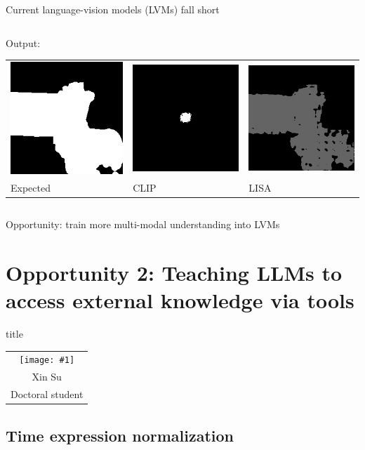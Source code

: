 \documentclass[14pt,aspectratio=169]{beamer}
\newcommand{\headshot}[3]{{\tiny\setlength{\tabcolsep}{0pt}%
\begin{tabular}{c}
\texttt{[image: \#1]} \\
#2 \\
#3
\end{tabular}}}
\newcommand{\sectionbox}{%
\centering
\begin{beamercolorbox}[sep=8pt,center,shadow=true,rounded=true]{title}
  \usebeamerfont{title}\insertsectionhead\par%
\end{beamercolorbox}
\vspace{.2\textheight}}
\begin{document}
\begin{frame}{Current language-vision models (LVMs) fall short}
\begin{columns}
\begin{column}{0.48\textwidth}
\medskip
Output: \\
\begin{tabular}{ l l l @{}}
\includegraphics[width=.25\textwidth]{compgeo/GL024_425_color_output_reference.png}
&
\includegraphics[width=.25\textwidth]{compgeo/GL024_425_color_output_clip.png}
&
\includegraphics[width=.25\textwidth]{compgeo/GL024_425_color_output_lisa.jpg}
\\
Expected & CLIP & LISA
\end{tabular}
\end{column}
\end{columns}
\pause
\bigskip
\alert{Opportunity: train more multi-modal understanding into LVMs}
\end{frame}

\section{Opportunity 2: Teaching LLMs to access external knowledge via tools}

\begin{frame}[b]
\sectionbox
\hfill
\headshot{people/su-xin.jpg}{Xin Su}{Doctoral student}
\end{frame}

\subsection{Time expression normalization}
\end{document}
